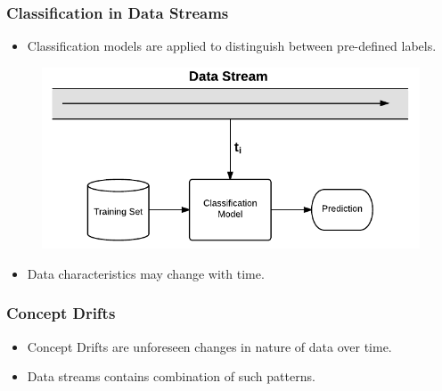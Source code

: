 \documentclass[14pt]{beamer}
\begin{document}
\begin{frame}\frametitle{Classification in Data Streams}

\begin{itemize}
\item Classification models are applied to distinguish between pre-defined labels.
\end{itemize}

\vspace{-0.2in}
\begin{figure}
\centering
\includegraphics[scale=0.6]{Stream1}
\end{figure}
\vspace{-0.2in}
\pause
\begin{itemize}
\item \alert{Data characteristics may change with time}.
\end{itemize}
\end{frame}

\begin{frame}\frametitle{Concept Drifts}
\begin{itemize}
\item Concept Drifts are unforeseen changes in nature of data over time.
\end{itemize}

\vspace{-0.5in}

\vspace{-0.5in}
\begin{itemize}
\item Data streams contains combination of such patterns.
\end{itemize}
\end{frame}


\end{document}
